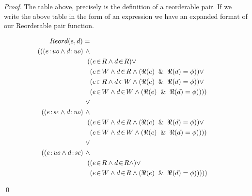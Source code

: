 \begin{proof}
    
    The table above, precisely is the definition of a reorderable pair. If we write the above table in the form of an expression we have an expanded format of our Reorderable pair function. 

    \begin{align*}
        Reord(e,d) = \\
        (
        ((\et{e}{uo} \wedge \et{d}{uo}) \ \wedge \\ 
            \quad ( 
                    &(\event{e}{R} \wedge \event{d}{R}) \vee \\ 
                    &(\event{e}{W} \wedge \event{d}{R} \wedge (\Re(e) \And \Re(d) = \phi)) \vee \\
                    &(\event{e}{R} \wedge \event{d}{W} \wedge (\Re(e) \And \Re(d) = \phi)) \vee \\
                    &(\event{e}{W} \wedge \event{d}{W} \wedge (\Re(e) \And \Re(d) = \phi)) 
                )
        ) \\ \vee \\
        ((\et{e}{sc} \wedge \et{d}{uo}) \ \wedge \\
            \quad (
                    & (\event{e}{W} \wedge \event{d}{R} \wedge (\Re(e) \And \Re(d) = \phi)) \vee \\
                    & (\event{e}{W} \wedge \event{d}{W} \wedge (\Re(e) \And \Re(d) = \phi)) 
                )
        ) \\ \vee \\
        ((\et{e}{uo} \wedge \et{d}{sc}) \ \wedge \\
            \quad (
                    & (\event{e}{R} \wedge \event{d}{R} \wedge) \vee \\
                    & (\event{e}{W} \wedge \event{d}{R} \wedge (\Re(e) \And \Re(d) = \phi)) 
                )
        )
        )
    \end{align*}
        
        \qed  
\end{proof}